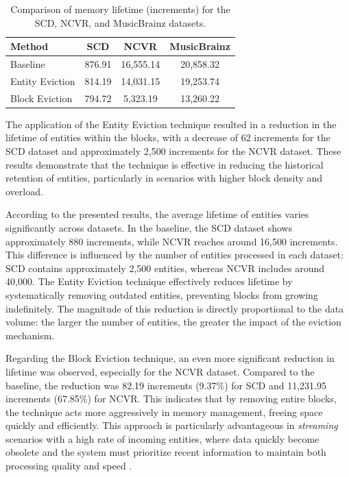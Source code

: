 \documentclass{ieeeaccess}
\begin{document}
\begin{table}[h]
\centering
\caption{Comparison of memory lifetime (increments) for the SCD, NCVR, and MusicBrainz datasets.}
\label{tab:comparacao_memoria_consolidada}
\begin{tabular}{lccc}
\hline
\textbf{Method} & \textbf{SCD} & \textbf{NCVR} & \textbf{MusicBrainz} \\
\hline
Baseline & 876.91 & 16,555.14 & 20,858.32 \\
Entity Eviction & 814.19 & 14,031.15 & 19,253.74 \\
Block Eviction & 794.72 & 5,323.19 & 13,260.22 \\
\hline
\end{tabular}
\end{table}

The application of the Entity Eviction technique resulted in a reduction in the lifetime of entities within the blocks, with a decrease of 62 increments for the SCD dataset and approximately 2,500 increments for the NCVR dataset. These results demonstrate that the technique is effective in reducing the historical retention of entities, particularly in scenarios with higher block density and overload.

According to the presented results, the average lifetime of entities varies significantly across datasets. In the baseline, the SCD dataset shows approximately 880 increments, while NCVR reaches around 16,500 increments. This difference is influenced by the number of entities processed in each dataset: SCD contains approximately 2,500 entities, whereas NCVR includes around 40,000. The Entity Eviction technique effectively reduces lifetime by systematically removing outdated entities, preventing blocks from growing indefinitely. The magnitude of this reduction is directly proportional to the data volume: the larger the number of entities, the greater the impact of the eviction mechanism.

Regarding the Block Eviction technique, an even more significant reduction in lifetime was observed, especially for the NCVR dataset. Compared to the baseline, the reduction was 82.19 increments (9.37\%) for SCD and 11,231.95 increments (67.85\%) for NCVR. This indicates that by removing entire blocks, the technique acts more aggressively in memory management, freeing space quickly and efficiently. This approach is particularly advantageous in \textit{streaming} scenarios with a high rate of incoming entities, where data quickly become obsolete and the system must prioritize recent information to maintain both processing quality and speed \cite{ARAUJO2025102506}.
\end{document}
